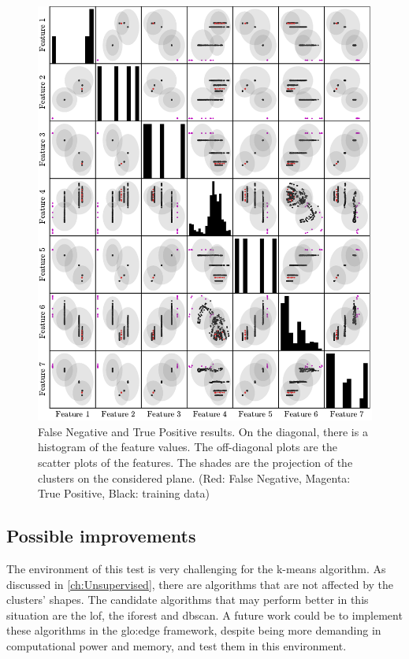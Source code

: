 \begin{figure}
    \centering
    \includegraphics{Images/shaker/ConfusionMatrix.pdf}
    \caption{False Negative and True Positive results. On the diagonal, there is a histogram of the feature values. The off-diagonal plots are the scatter plots of the features. The shades are the projection of the clusters on the considered plane. (Red: False Negative, Magenta: True Positive, Black: training data)}
    \label{fig:shaker_conf_matrix}
\end{figure}
\clearpage

\subsection{Possible improvements}
The environment of this test is very challenging for the k-means algorithm. As discussed in \autoref{ch:Unsupervised}, there are algorithms that are not affected by the clusters' shapes. The candidate algorithms that may perform better in this situation are the \gls{lof}, the \gls{iforest} and \gls{dbscan}. A future work could be to implement these algorithms in the \gls{glo:edge} framework, despite being more demanding in computational power and memory, and test them in this environment.

